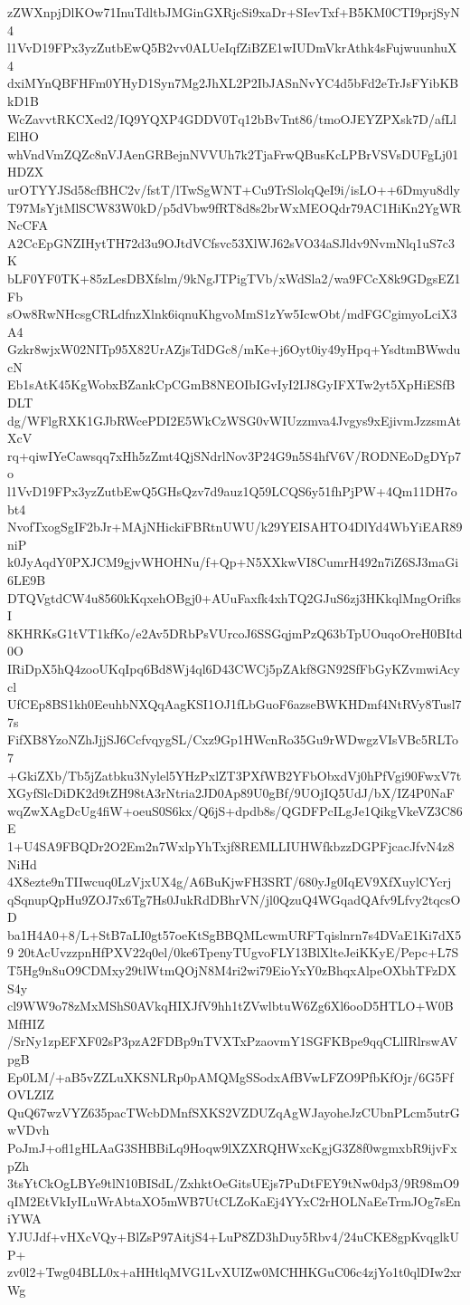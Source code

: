 zZWXnpjDlKOw71InuTdltbJMGinGXRjcSi9xaDr+SIevTxf+B5KM0CTI9prjSyN4
l1VvD19FPx3yzZutbEwQ5B2vv0ALUeIqfZiBZE1wIUDmVkrAthk4sFujwuunhuX4
dxiMYnQBFHFm0YHyD1Syn7Mg2JhXL2P2IbJASnNvYC4d5bFd2eTrJsFYibKBkD1B
WcZavvtRKCXed2/IQ9YQXP4GDDV0Tq12bBvTnt86/tmoOJEYZPXsk7D/afLlElHO
whVndVmZQZc8nVJAenGRBejnNVVUh7k2TjaFrwQBusKcLPBrVSVsDUFgLj01HDZX
urOTYYJSd58cfBHC2v/fstT/lTwSgWNT+Cu9TrSlolqQeI9i/isLO++6Dmyu8dly
T97MsYjtMlSCW83W0kD/p5dVbw9fRT8d8s2brWxMEOQdr79AC1HiKn2YgWRNcCFA
A2CcEpGNZIHytTH72d3u9OJtdVCfsvc53XlWJ62sVO34aSJldv9NvmNlq1uS7c3K
bLF0YF0TK+85zLesDBXfslm/9kNgJTPigTVb/xWdSla2/wa9FCcX8k9GDgsEZ1Fb
sOw8RwNHcsgCRLdfnzXlnk6iqnuKhgvoMmS1zYw5IcwObt/mdFGCgimyoLciX3A4
Gzkr8wjxW02NITp95X82UrAZjsTdDGc8/mKe+j6Oyt0iy49yHpq+YsdtmBWwducN
Eb1sAtK45KgWobxBZankCpCGmB8NEOIbIGvIyI2IJ8GyIFXTw2yt5XpHiESfBDLT
dg/WFlgRXK1GJbRWcePDI2E5WkCzWSG0vWIUzzmva4Jvgys9xEjivmJzzsmAtXcV
rq+qiwIYeCawsqq7xHh5zZmt4QjSNdrlNov3P24G9n5S4hfV6V/RODNEoDgDYp7o
l1VvD19FPx3yzZutbEwQ5GHsQzv7d9auz1Q59LCQS6y51fhPjPW+4Qm11DH7obt4
NvofTxogSgIF2bJr+MAjNHickiFBRtnUWU/k29YEISAHTO4DlYd4WbYiEAR89niP
k0JyAqdY0PXJCM9gjvWHOHNu/f+Qp+N5XXkwVI8CumrH492n7iZ6SJ3maGi6LE9B
DTQVgtdCW4u8560kKqxehOBgj0+AUuFaxfk4xhTQ2GJuS6zj3HKkqlMngOrifksI
8KHRKsG1tVT1kfKo/e2Av5DRbPsVUrcoJ6SSGqjmPzQ63bTpUOuqoOreH0BItd0O
IRiDpX5hQ4zooUKqIpq6Bd8Wj4ql6D43CWCj5pZAkf8GN92SfFbGyKZvmwiAcycl
UfCEp8BS1kh0EeuhbNXQqAagKSI1OJ1fLbGuoF6azseBWKHDmf4NtRVy8Tusl77s
FifXB8YzoNZhJjjSJ6CcfvqygSL/Cxz9Gp1HWcnRo35Gu9rWDwgzVIsVBc5RLTo7
+GkiZXb/Tb5jZatbku3Nylel5YHzPxlZT3PXfWB2YFbObxdVj0hPfVgi90FwxV7t
XGyfSlcDiDK2d9tZH98tA3rNtria2JD0Ap89U0gBf/9UOjIQ5UdJ/bX/IZ4P0NaF
wqZwXAgDcUg4fiW+oeuS0S6kx/Q6jS+dpdb8s/QGDFPcILgJe1QikgVkeVZ3C86E
1+U4SA9FBQDr2O2Em2n7WxlpYhTxjf8REMLLIUHWfkbzzDGPFjcacJfvN4z8NiHd
4X8ezte9nTIIwcuq0LzVjxUX4g/A6BuKjwFH3SRT/680yJg0IqEV9XfXuylCYcrj
qSqnupQpHu9ZOJ7x6Tg7Hs0JukRdDBhrVN/jl0QzuQ4WGqadQAfv9Lfvy2tqcsOD
ba1H4A0+8/L+StB7aLI0gt57oeKtSgBBQMLcwmURFTqislnrn7s4DVaE1Ki7dX59
20tAcUvzzpnHfPXV22q0el/0ke6TpenyTUgvoFLY13BlXlteJeiKKyE/Pepc+L7S
T5Hg9n8uO9CDMxy29tlWtmQOjN8M4ri2wi79EioYxY0zBhqxAlpeOXbhTFzDXS4y
cl9WW9o78zMxMShS0AVkqHIXJfV9hh1tZVwlbtuW6Zg6Xl6ooD5HTLO+W0BMfHIZ
/SrNy1zpEFXF02sP3pzA2FDBp9nTVXTxPzaovmY1SGFKBpe9qqCLlIRlrswAVpgB
Ep0LM/+aB5vZZLuXKSNLRp0pAMQMgSSodxAfBVwLFZO9PfbKfOjr/6G5FfOVLZIZ
QuQ67wzVYZ635pacTWcbDMnfSXKS2VZDUZqAgWJayoheJzCUbnPLcm5utrGwVDvh
PoJmJ+ofl1gHLAaG3SHBBiLq9Hoqw9lXZXRQHWxcKgjG3Z8f0wgmxbR9ijvFxpZh
3tsYtCkOgLBYe9tlN10BISdL/ZxhktOeGitsUEjs7PuDtFEY9tNw0dp3/9R98mO9
qIM2EtVkIyILuWrAbtaXO5mWB7UtCLZoKaEj4YYxC2rHOLNaEeTrmJOg7sEniYWA
YJUJdf+vHXcVQy+BlZsP97AitjS4+LuP8ZD3hDuy5Rbv4/24uCKE8gpKvqglkUP+
zv0l2+Twg04BLL0x+aHHtlqMVG1LvXUIZw0MCHHKGuC06c4zjYo1t0qlDIw2xrWg
